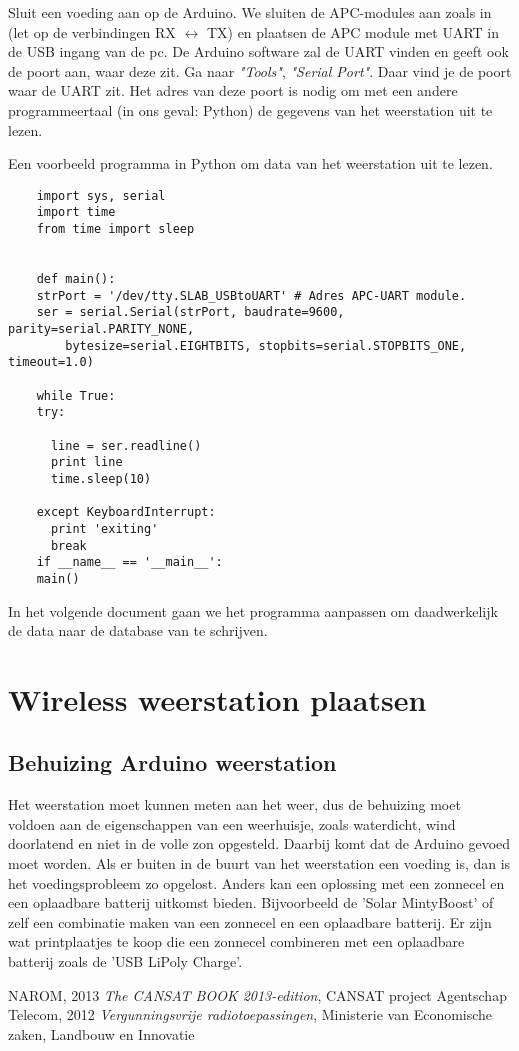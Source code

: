 Sluit een voeding aan op de Arduino.
We sluiten de APC-modules aan zoals in  (let op de
verbindingen RX $\longleftrightarrow$ TX) en plaatsen de APC module met UART
in de USB ingang van de pc. De Arduino software zal de UART vinden en
geeft ook de poort aan, waar deze zit. Ga naar \emph {"Tools"},
\emph{"Serial Port"}. Daar vind je de poort waar de UART  zit. Het adres
van deze poort is nodig om met een andere programmeertaal (in ons
geval: Python) de gegevens van het weerstation uit te lezen.  

Een voorbeeld programma in Python om data van het weerstation uit te lezen.

\begin{verbatim}
    import sys, serial
    import time
    from time import sleep
   
    
    def main():
    strPort = '/dev/tty.SLAB_USBtoUART' # Adres APC-UART module.
    ser = serial.Serial(strPort, baudrate=9600, parity=serial.PARITY_NONE, 
        bytesize=serial.EIGHTBITS, stopbits=serial.STOPBITS_ONE, timeout=1.0)
    
    while True:
    try:

      line = ser.readline()
      print line
      time.sleep(10)
 
    except KeyboardInterrupt:
      print 'exiting'
      break
    if __name__ == '__main__':
    main()
\end{verbatim}

In het volgende document gaan we het programma aanpassen om daadwerkelijk de 
data naar de database van \hisparc te schrijven.

\section{Wireless weerstation plaatsen}

\subsection{Behuizing Arduino weerstation} Het weerstation moet kunnen
meten aan het weer, dus de behuizing moet voldoen aan de eigenschappen
van een weerhuisje, zoals waterdicht, wind doorlatend en niet in de
volle zon opgesteld. Daarbij komt dat de Arduino gevoed moet worden. Als
er buiten in de buurt van het weerstation een voeding is, dan is het
voedingsprobleem zo opgelost. Anders kan een oplossing met een zonnecel
en een oplaadbare batterij uitkomst bieden. Bijvoorbeeld de 'Solar
MintyBoost' of zelf een combinatie maken van een zonnecel en een
oplaadbare batterij. Er zijn wat printplaatjes te koop die een zonnecel
combineren met een oplaadbare batterij zoals de 'USB LiPoly Charge'.

  


 
\begin{thebibliography}{9}
        NAROM, 2013 \emph{The CANSAT BOOK 2013-edition}, 
        CANSAT project
    Agentschap Telecom, 2012 \emph{Vergunningsvrije radiotoepassingen}, 
    Ministerie van Economische zaken, Landbouw en Innovatie
\end{thebibliography}



